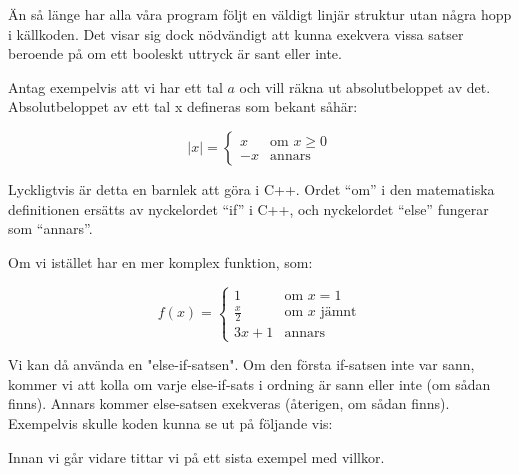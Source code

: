Än så länge har alla våra program följt en väldigt linjär struktur utan några hopp i källkoden. Det visar sig dock nödvändigt att kunna exekvera vissa satser beroende på om ett booleskt uttryck är sant eller inte.

Antag exempelvis att vi har ett tal $a$ och vill räkna ut absolutbeloppet av det. Absolutbeloppet av ett tal x defineras som bekant såhär:

$$
|x| = 
\left\{
    \begin{array}{ll}
        x & \mbox{om } x \geq 0 \\
        -x & \mbox{annars}
    \end{array}
\right.
$$

Lyckligtvis är detta en barnlek att göra i C++. Ordet ``om'' i den matematiska definitionen ersätts av nyckelordet ``if'' i C++, och nyckelordet ``else'' fungerar som ``annars''.



Om vi istället har en mer komplex funktion, som:

$$
f(x) = 
\left\{
    \begin{array}{lll}
        1 & \mbox{om } x = 1\\
        \frac{x}{2} & \mbox{om } x \mbox{ jämnt}\\
        3x+1 & \mbox{annars}
    \end{array}
\right.
$$

Vi kan då använda en "else-if-satsen". Om den första if-satsen inte var sann, kommer vi att kolla om varje else-if-sats i ordning är sann eller inte (om sådan finns). Annars kommer else-satsen exekveras (återigen, om sådan finns). Exempelvis skulle koden kunna se ut på följande vis:




Innan vi går vidare tittar vi på ett sista exempel med villkor.



